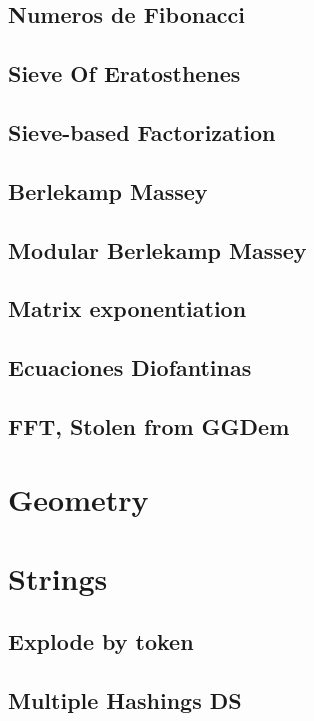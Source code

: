 \subsection{Numeros de Fibonacci}
\subsection{Sieve Of Eratosthenes}
\subsection{Sieve-based Factorization}
\subsection{Berlekamp Massey}
\subsection{Modular Berlekamp Massey}
\subsection{Matrix exponentiation}
\subsection{Ecuaciones Diofantinas}
\subsection{FFT, Stolen from GGDem}

\section{Geometry}


\section{Strings}
\subsection{Explode by token}
\subsection{Multiple Hashings DS}
